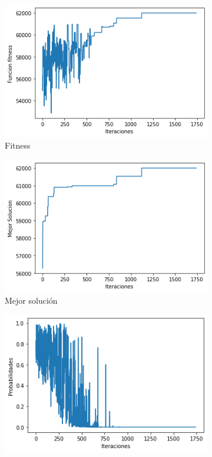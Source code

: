 \documentclass[a4paper,12pt]{article}
\begin{document}
	\begin{figure}[H]
		\centering
		\begin{subfigure}{0.24\textwidth}
			\centering
			\includegraphics[width=\textwidth]{include/L10/fitness.png}
			\caption{Fitness}
		\end{subfigure}
		\hfill
		\begin{subfigure}{0.24\textwidth}
			\centering
			\includegraphics[width=\textwidth]{include/L10/mejor_solucion.png}
			\caption{Mejor solución}
		\end{subfigure}
		\hfill
		\begin{subfigure}{0.24\textwidth}
			\centering
			\includegraphics[width=\textwidth]{include/L10/probabilidades.png}

\end{subfigure}
\end{figure}
\end{document}
